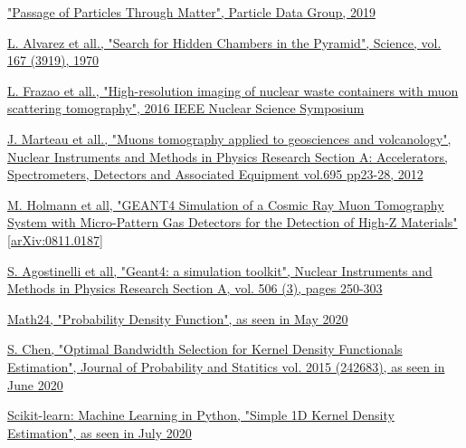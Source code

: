 \documentclass[a4paper, 11pt, twoside, openright]{report}
\begin{document}
\begin{thebibliography}{1}
\href{http://pdg.lbl.gov/2019/reviews/rpp2019-rev-passage-particles-matter.pdf}{
"Passage of Particles Through Matter", Particle Data Group, 2019}

\href{https://ui.adsabs.harvard.edu/abs/1970Sci...167..832A/abstract}{L. Alvarez et all.,
"Search for Hidden Chambers in the Pyramid", 
Science, vol. 167 (3919), 1970}

\href{https://ieeexplore.ieee.org/document/8069918}{L. Frazao et all.,
"High-resolution imaging of nuclear waste containers with muon scattering tomography", 
2016 IEEE Nuclear Science Symposium}

\href{https://ui.adsabs.harvard.edu/abs/1970Sci...167..832A/abstract}{J. Marteau et all.,
"Muons tomography applied to geosciences and volcanology", 
Nuclear Instruments and Methods in Physics Research Section A: Accelerators, Spectrometers, Detectors and Associated Equipment vol.695 pp23-28, 2012
}

\href{https://arxiv.org/pdf/0811.0187.pdf}{M. Holmann et all, "GEANT4 Simulation of a Cosmic Ray Muon Tomography System with Micro-Pattern Gas Detectors for the Detection of High-Z Materials" [arXiv:0811.0187]}

\href{https://www.sciencedirect.com/science/article/pii/S0168900203013688}{S. Agostinelli et all, "Geant4: a simulation toolkit", Nuclear Instruments and Methods in Physics Research Section A, vol. 506 (3), pages 250-303}

\href{https://www.math24.net/probability-density-function/}{Math24, "Probability Density Function", as seen in May 2020}

\href{https://www.hindawi.com/journals/jps/2015/242683/}{S. Chen, "Optimal Bandwidth Selection for Kernel Density Functionals Estimation", Journal of Probability and Statitics vol. 2015 (242683), as seen in June 2020}

\href{https://scikit-learn.org/stable/auto_examples/neighbors/plot_kde_1d.html}{Scikit-learn: Machine Learning in {P}ython, "Simple 1D Kernel Density Estimation", as seen in July 2020}

\end{thebibliography}
\end{document}
